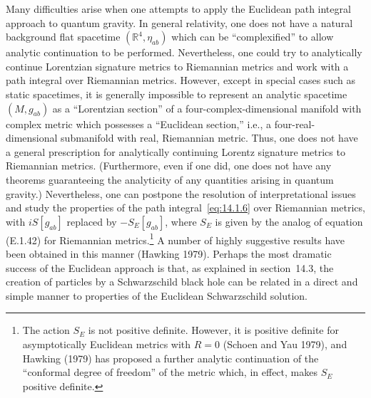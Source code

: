 Many difficulties arise when one attempts to apply the Euclidean path integral
approach to quantum gravity. In general relativity, one does not have a natural
background flat spacetime \((\mathbb R^4,\eta_{ab})\) which can be ``complexified'' to
allow analytic continuation to be performed. Nevertheless, one could try to analytically
continue Lorentzian signature metrics to Riemannian metrics and work with a path
integral over Riemannian metrics. However, except in special cases such as static
spacetimes, it is generally impossible to represent an analytic spacetime \((M,g_{ab})\)
as a ``Lorentzian section'' of a four-complex-dimensional manifold with complex metric
which possesses a ``Euclidean section,'' i.e., a four-real-dimensional submanifold with
real, Riemannian metric. Thus, one does not have a general prescription for analytically
continuing Lorentz signature metrics to Riemannian metrics. (Furthermore, even if
one did, one does not have any theorems guaranteeing the analyticity of any quantities
arising in quantum gravity.) Nevertheless, one can postpone the resolution of
interpretational issues and study the properties of the path integral~\eqref{eq:14.1.6}
over Riemannian metrics, with \(iS[g_{ab}]\) replaced by \(-S_E[g_{ab}]\), where \(S_E\)
is given by the analog of equation (E.1.42) for Riemannian metrics.\footnote{The action
\(S_E\) is not positive definite. However, it is positive definite for asymptotically
Euclidean metrics with \(R=0\) (Schoen and Yau 1979), and Hawking (1979) has
proposed a further analytic continuation of the ``conformal degree of freedom'' of the
metric which, in effect, makes \(S_E\) positive definite.} A number of highly suggestive
results have been obtained in this manner (Hawking 1979). Perhaps the most dramatic
success of the Euclidean approach is that, as explained in section~14.3, the creation of
particles by a Schwarzschild black hole can be related in a direct and simple manner
to properties of the Euclidean Schwarzschild solution.

